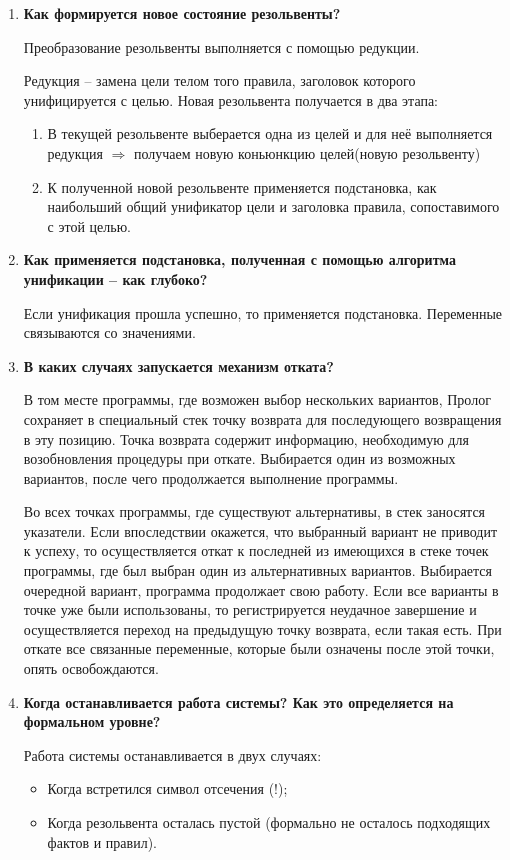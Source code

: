 \begin{enumerate}
    \item \textbf{Как формируется новое состояние резольвенты?}

        Преобразование резольвенты выполняется с помощью редукции.

        Редукция -- замена цели телом того правила, заголовок которого унифицируется с целью.
        Новая резольвента получается в два этапа:

        \begin{enumerate}
            \item В текущей резольвенте выберается одна из целей и для неё выполняется редукция $\Rightarrow$ получаем новую коньюнкцию целей(новую резольвенту)
            \item К полученной новой резольвенте применяется подстановка, как наибольший общий унификатор цели и заголовка правила, сопоставимого с этой целью.
        \end{enumerate}

    \item \textbf{Как применяется подстановка, полученная с помощью алгоритма унификации – как глубоко?}

        Если унификация прошла успешно, то применяется подстановка. Переменные связываются со значениями.

    \item \textbf{В каких случаях запускается механизм отката?}

        В том месте программы, где возможен выбор нескольких вариантов, Пролог сохраняет в специальный стек точку возврата для последующего возвращения в эту позицию. Точка возврата содержит информацию, необходимую для возобновления процедуры при откате. Выбирается один из возможных вариантов, после чего продолжается выполнение программы.

Во всех точках программы, где существуют альтернативы, в стек заносятся указатели. Если впоследствии окажется, что выбранный вариант не приводит к успеху, то осуществляется откат к последней из имеющихся в стеке точек программы, где был выбран один из альтернативных вариантов. Выбирается очередной вариант, программа продолжает свою работу. Если все варианты в точке уже были использованы, то регистрируется неудачное завершение и осуществляется переход на предыдущую точку возврата, если такая есть. При откате все связанные переменные, которые были означены после этой точки, опять освобождаются.

    \item \textbf{Когда останавливается работа системы? Как это определяется на формальном уровне?}

        Работа системы останавливается в двух случаях:

        \begin{itemize}
            \item Когда встретился символ отсечения (!);
            \item Когда резольвента осталась пустой (формально не осталось подходящих фактов и правил).
        \end{itemize}
\end{enumerate}
